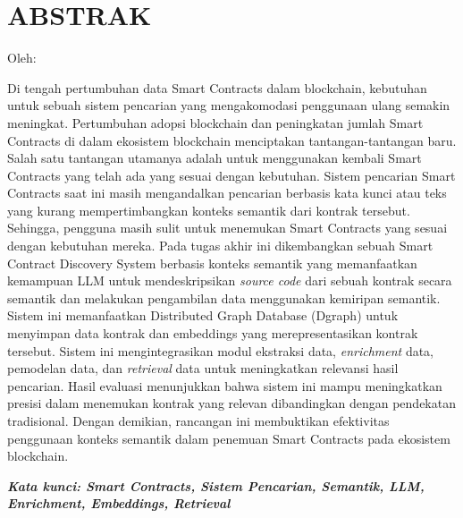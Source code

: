\clearpage
\chapter*{ABSTRAK}
\begin{center}
	\center
	\begin{singlespace}
		\large\bfseries\MakeUppercase{\thetitle}

		\normalfont\normalsize
		Oleh:

		\bfseries \theauthor
	\end{singlespace}
\end{center}

\begin{singlespace}
	\small

    Di tengah pertumbuhan data Smart Contracts dalam blockchain, kebutuhan untuk sebuah sistem pencarian yang mengakomodasi penggunaan ulang semakin meningkat.
	Pertumbuhan adopsi blockchain dan peningkatan jumlah Smart Contracts di dalam ekosistem blockchain menciptakan tantangan-tantangan baru. Salah satu tantangan utamanya adalah untuk menggunakan kembali Smart Contracts yang telah ada yang sesuai dengan kebutuhan. Sistem pencarian Smart Contracts saat ini masih mengandalkan pencarian berbasis kata kunci atau teks yang kurang mempertimbangkan konteks semantik dari kontrak tersebut. Sehingga, pengguna masih sulit untuk menemukan Smart Contracts yang sesuai dengan kebutuhan mereka. Pada tugas akhir ini dikembangkan sebuah Smart Contract Discovery System berbasis konteks semantik yang memanfaatkan kemampuan LLM untuk mendeskripsikan \textit{source code} dari sebuah kontrak secara semantik dan melakukan pengambilan data menggunakan kemiripan semantik. Sistem ini memanfaatkan Distributed Graph Database (Dgraph) untuk menyimpan data kontrak dan embeddings yang merepresentasikan kontrak tersebut. Sistem ini mengintegrasikan modul ekstraksi data, \textit{enrichment} data, pemodelan data, dan \textit{retrieval} data untuk meningkatkan relevansi hasil pencarian. Hasil evaluasi menunjukkan bahwa sistem ini mampu meningkatkan presisi dalam menemukan kontrak yang relevan dibandingkan dengan pendekatan tradisional. Dengan demikian, rancangan ini membuktikan efektivitas penggunaan konteks semantik dalam penemuan Smart Contracts pada ekosistem blockchain.

	\textbf{\textit{Kata kunci: Smart Contracts, Sistem Pencarian, Semantik, LLM, Enrichment, Embeddings, Retrieval}}

\end{singlespace}
\clearpage